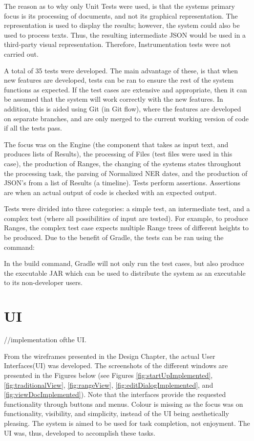 \par The reason as to why only Unit Tests were used, is that the systems primary focus is its processing of documents, and not its graphical representation. The representation is used to display the results; however, the system could also be used to process texts. Thus, the resulting intermediate JSON would be used in a third-party visual representation. Therefore, Instrumentation tests were not carried out.

\par A total of 35 tests were developed. The main advantage of these, is that when new features are developed, tests can be ran to ensure the rest of the system functions as expected. If the test cases are extensive and appropriate, then it can be assumed that the system will work correctly with the new features. In addition, this is aided using Git (in Git flow), where the features are developed on separate branches, and are only merged to the current working version of code if all the tests pass.

\par The focus was on the Engine (the component that takes as input text, and produces lists of Results), the processing of Files (test files were used in this case), the production of Ranges, the changing of the systems states throughout the processing task, the parsing of Normalized NER dates, and the production of JSON's from a list of Results (a timeline). Tests perform assertions. Assertions are when an actual output of code is checked with an expected output.

\par Tests were divided into three categories: a simple test, an intermediate test, and a complex test (where all possibilities of input are tested). For example, to produce Ranges, the complex test case expects multiple Range trees of different heights to be produced. Due to the benefit of Gradle, the tests can be ran using the command:\par
{}
In the build command, Gradle will not only run the test cases, but also produce the executable JAR which can be used to distribute the system as an executable to its non-developer users.

\section{UI}
//implementation ofthe UI.
\par From the wireframes presented in the Design Chapter, the actual User Interfaces(UI) was developed. The screenshots of the different windows are presented in the Figures below (see Figures \ref{fig:startUpImplemented}, \ref{fig:traditionalView}, \ref{fig:rangeView}, \ref{fig:editDialogImplemented}, and \ref{fig:viewDocImplemented}). Note that the interfaces provide the requested functionality through buttons and menus. Colour is missing as the focus was on functionality, visibility, and simplicity, instead of the UI being aesthetically pleasing. The system is aimed to be used for task completion, not enjoyment. The UI was, thus, developed to accomplish these tasks.

